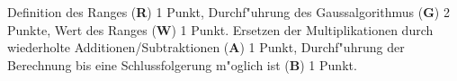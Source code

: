 \begin{bewertung}
Definition des Ranges ({\bf R}) 1 Punkt,
Durchf"uhrung des Gaussalgorithmus ({\bf G}) 2 Punkte,
Wert des Ranges ({\bf W}) 1 Punkt.
Ersetzen der Multiplikationen durch wiederholte Additionen/Subtraktionen
({\bf A}) 1 Punkt, Durchf"uhrung der Berechnung bis eine
Schlussfolgerung m"oglich ist ({\bf B}) 1 Punkt.
\end{bewertung}

